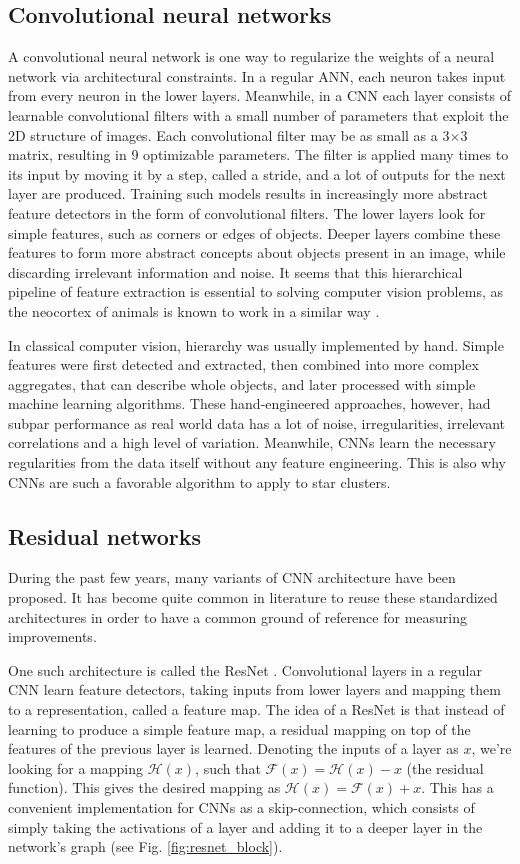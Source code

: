 \documentclass{aa}
\begin{document}
\subsection{Convolutional neural networks}
A convolutional neural network is one way to regularize the weights of a neural network via architectural constraints. In a regular ANN, each neuron takes input from every neuron in the lower layers. Meanwhile, in a CNN each layer consists of learnable convolutional filters with a small number of parameters that exploit the 2D structure of images. Each convolutional filter may be as small as a 3$\times$3 matrix, resulting in 9 optimizable parameters. The filter is applied many times to its input by moving it by a step, called a stride, and a lot of outputs for the next layer are produced. Training such models results in increasingly more abstract feature detectors in the form of convolutional filters. The lower layers look for simple features, such as corners or edges of objects. Deeper layers combine these features to form more abstract concepts about objects present in an image, while discarding irrelevant information and noise. It seems that this hierarchical pipeline of feature extraction is essential to solving computer vision problems, as the neocortex of animals is known to work in a similar way \citep{primate_visual_cortex}.

In classical computer vision, hierarchy was usually implemented by hand. Simple features were first detected and extracted, then combined into more complex aggregates, that can describe whole objects, and later processed with simple machine learning algorithms. These hand-engineered approaches, however, had subpar performance as real world data has a lot of noise, irregularities, irrelevant correlations and a high level of variation. Meanwhile, CNNs learn the necessary regularities from the data itself without any feature engineering. This is also why CNNs are such a favorable algorithm to apply to star clusters.

\subsection{Residual networks}
During the past few years, many variants of CNN architecture have been proposed. It has become quite common in literature to reuse these standardized architectures in order to have a common ground of reference for measuring improvements.

One such architecture is called the ResNet \citep{2015arXiv151203385H}. Convolutional layers in a regular CNN learn feature detectors, taking inputs from lower layers and mapping them to a representation, called a feature map. The idea of a ResNet is that instead of learning to produce a simple feature map, a residual mapping on top of the features of the previous layer is learned. Denoting the inputs of a layer as $x$, we're looking for a mapping $\mathcal{H}(x)$, such that $\mathcal{F}(x)=\mathcal{H}(x)-x$ (the residual function). This gives the desired mapping as $\mathcal{H}(x)=\mathcal{F}(x)+x$. This has a convenient implementation for CNNs as a skip-connection, which consists of simply taking the activations of a layer and adding it to a deeper layer in the network's graph (see Fig. \ref{fig:resnet_block}).
\end{document}
